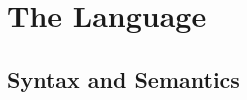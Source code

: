 \section{The Language \OurLang}
\label{sec:language}


\subsection{Syntax and Semantics}
\label{sec:syntax}



